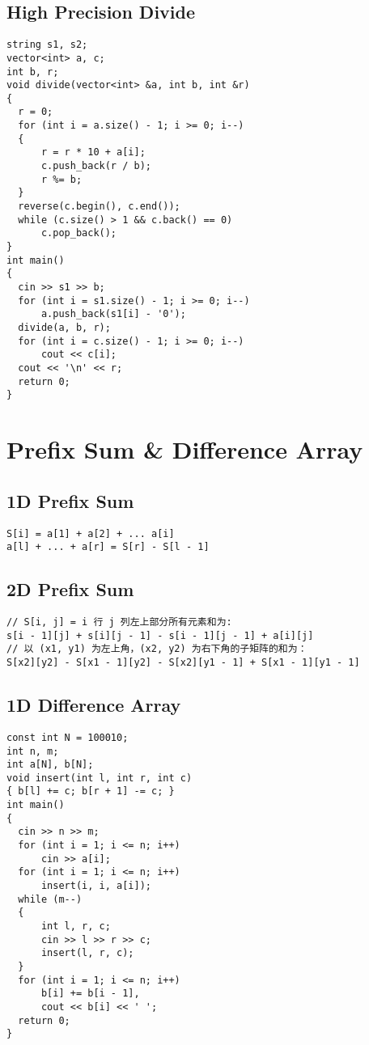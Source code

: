 \subsection{High Precision Divide}
\begin{lstlisting}
string s1, s2;
vector<int> a, c;
int b, r;
void divide(vector<int> &a, int b, int &r)
{
  r = 0;
  for (int i = a.size() - 1; i >= 0; i--)
  {
      r = r * 10 + a[i];
      c.push_back(r / b);
      r %= b;
  }
  reverse(c.begin(), c.end());
  while (c.size() > 1 && c.back() == 0)
      c.pop_back();
}
int main()
{
  cin >> s1 >> b;
  for (int i = s1.size() - 1; i >= 0; i--)
      a.push_back(s1[i] - '0');
  divide(a, b, r);
  for (int i = c.size() - 1; i >= 0; i--)
      cout << c[i];
  cout << '\n' << r;
  return 0;
}
\end{lstlisting}
\section{Prefix Sum \& Difference Array}
\subsection{1D Prefix Sum}
\begin{lstlisting}
S[i] = a[1] + a[2] + ... a[i]
a[l] + ... + a[r] = S[r] - S[l - 1]
\end{lstlisting}
\subsection{2D Prefix Sum}
\begin{lstlisting}
// S[i, j] = i 行 j 列左上部分所有元素和为:
s[i - 1][j] + s[i][j - 1] - s[i - 1][j - 1] + a[i][j]
// 以 (x1, y1) 为左上角，(x2, y2) 为右下角的子矩阵的和为：
S[x2][y2] - S[x1 - 1][y2] - S[x2][y1 - 1] + S[x1 - 1][y1 - 1]
\end{lstlisting}
\subsection{1D Difference Array}
\begin{lstlisting}
const int N = 100010;
int n, m;
int a[N], b[N];
void insert(int l, int r, int c)
{ b[l] += c; b[r + 1] -= c; }
int main()
{
  cin >> n >> m;
  for (int i = 1; i <= n; i++)
      cin >> a[i];
  for (int i = 1; i <= n; i++)
      insert(i, i, a[i]);
  while (m--)
  {
      int l, r, c;
      cin >> l >> r >> c;
      insert(l, r, c);
  }
  for (int i = 1; i <= n; i++)
      b[i] += b[i - 1], 
      cout << b[i] << ' ';
  return 0;
}
\end{lstlisting}

